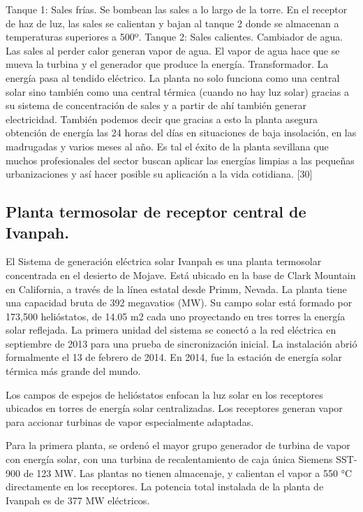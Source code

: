 \documentclass[12pt]{article}
\begin{document}
Tanque 1: Sales frías.
Se bombean las sales a lo largo de la torre.
En el receptor de haz de luz, las sales se calientan y bajan al tanque 2 donde se almacenan a temperaturas superiores a 500º.
Tanque 2: Sales calientes.
Cambiador de agua.
Las sales al perder calor generan vapor de agua.
El vapor de agua hace que se mueva la turbina y el generador que produce la energía.
Transformador. La energía pasa al tendido eléctrico.
La planta no solo funciona como una central solar sino también como una central térmica (cuando no hay luz solar) gracias a su sistema de concentración de sales y a partir de ahí también generar electricidad. También podemos decir que gracias a esto la planta asegura obtención de energía las 24 horas del días en situaciones de baja insolación, en las madrugadas y varios meses al año.
Es tal el éxito de la planta sevillana que muchos profesionales del sector buscan aplicar las energías limpias a las pequeñas urbanizaciones y así hacer posible su aplicación a la vida cotidiana. [30]



\subsection{Planta termosolar de receptor central de Ivanpah.}

El Sistema de generación eléctrica solar Ivanpah es una planta termosolar concentrada en el desierto de Mojave. Está ubicado en la base de Clark Mountain en California, a través de la línea estatal desde Primm, Nevada. La planta tiene una capacidad bruta de 392 megavatios (MW). Su campo solar está formado por 173,500 helióstatos, de 14.05 m2 cada uno proyectando en tres torres la energía solar reflejada. La primera unidad del sistema se conectó a la red eléctrica en septiembre de 2013 para una prueba de sincronización inicial. La instalación abrió formalmente el 13 de febrero de 2014. En 2014, fue la estación de energía solar térmica más grande del mundo.
 
Los campos de espejos de helióstatos enfocan la luz solar en los receptores ubicados en torres de energía solar centralizadas. Los receptores generan vapor para accionar turbinas de vapor especialmente adaptadas.
 
Para la primera planta, se ordenó el mayor grupo generador de turbina de vapor con energía solar, con una turbina de recalentamiento de caja única Siemens SST-900 de 123 MW. Las plantas no tienen almacenaje, y calientan el vapor a 550 °C directamente en los receptores. La potencia total instalada de la planta de Ivanpah es de 377 MW eléctricos.
 
\end{document}
